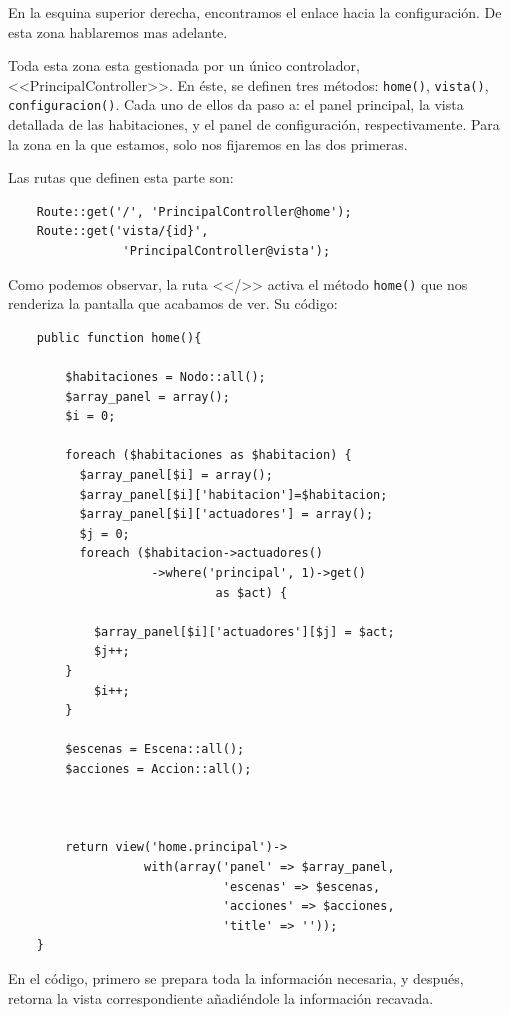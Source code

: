     En la esquina superior derecha, encontramos el enlace hacia la configuración. De esta zona hablaremos mas adelante.
    
   Toda esta zona esta gestionada por un único controlador, <<PrincipalController>>. En éste, se definen tres métodos: \lstinline|home()|,  \lstinline|vista()|, \lstinline|configuracion()|. Cada uno de ellos da paso a: el panel principal, la vista detallada de las habitaciones, y el panel de configuración, respectivamente. Para la zona en la que estamos, solo nos fijaremos en las dos primeras.
    
    Las rutas que definen esta parte son:
    \begin{lstlisting}
    Route::get('/', 'PrincipalController@home');
    Route::get('vista/{id}', 
                'PrincipalController@vista');
    \end{lstlisting}
    
    Como podemos observar, la ruta <</>> activa el método \lstinline|home()| que nos renderiza la pantalla que acabamos de ver. Su código:
    \begin{lstlisting}
    public function home(){
    
        $habitaciones = Nodo::all();
        $array_panel = array();
        $i = 0;
        
        foreach ($habitaciones as $habitacion) {
          $array_panel[$i] = array();
          $array_panel[$i]['habitacion']=$habitacion;
          $array_panel[$i]['actuadores'] = array();
          $j = 0;
          foreach ($habitacion->actuadores()
                    ->where('principal', 1)->get()
                             as $act) {
                    
            $array_panel[$i]['actuadores'][$j] = $act;
            $j++;
        }
            $i++;
        }
        
        $escenas = Escena::all();
        $acciones = Accion::all();
        
        
        
        return view('home.principal')->
                   with(array('panel' => $array_panel,
                              'escenas' => $escenas,
                              'acciones' => $acciones,
                              'title' => ''));
    }
    \end{lstlisting}
    
    En el código, primero se prepara toda la información necesaria, y después, retorna la vista correspondiente añadiéndole la información recavada.
    
